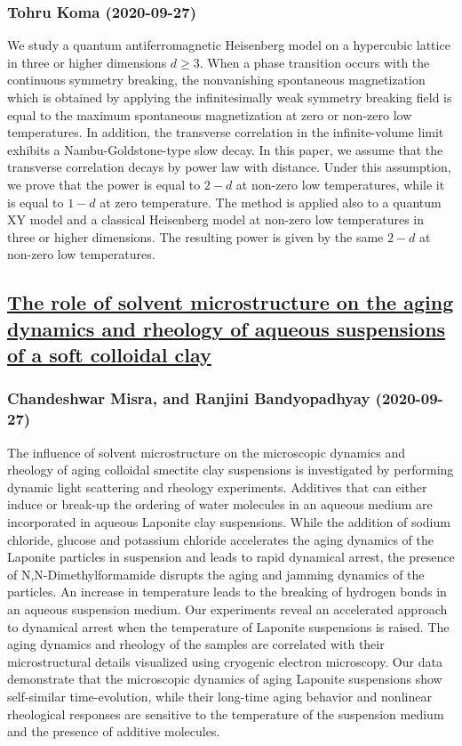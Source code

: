 \subsubsection*{Tohru Koma (2020-09-27)}
We study a quantum antiferromagnetic Heisenberg model on a hypercubic lattice
in three or higher dimensions $d\ge 3$. When a phase transition occurs with the
continuous symmetry breaking, the nonvanishing spontaneous magnetization which
is obtained by applying the infinitesimally weak symmetry breaking field is
equal to the maximum spontaneous magnetization at zero or non-zero low
temperatures. In addition, the transverse correlation in the infinite-volume
limit exhibits a Nambu-Goldstone-type slow decay. In this paper, we assume that
the transverse correlation decays by power law with distance. Under this
assumption, we prove that the power is equal to $2-d$ at non-zero low
temperatures, while it is equal to $1-d$ at zero temperature. The method is
applied also to a quantum XY model and a classical Heisenberg model at non-zero
low temperatures in three or higher dimensions. The resulting power is given by
the same $2-d$ at non-zero low temperatures.

\subsection*{\href{http://arxiv.org/abs/2009.12741v1}{The role of solvent microstructure on the aging dynamics and rheology of  aqueous suspensions of a soft colloidal clay}}
\subsubsection*{Chandeshwar Misra, and Ranjini Bandyopadhyay (2020-09-27)}
The influence of solvent microstructure on the microscopic dynamics and
rheology of aging colloidal smectite clay suspensions is investigated by
performing dynamic light scattering and rheology experiments. Additives that
can either induce or break-up the ordering of water molecules in an aqueous
medium are incorporated in aqueous Laponite clay suspensions. While the
addition of sodium chloride, glucose and potassium chloride accelerates the
aging dynamics of the Laponite particles in suspension and leads to rapid
dynamical arrest, the presence of N,N-Dimethylformamide disrupts the aging and
jamming dynamics of the particles. An increase in temperature leads to the
breaking of hydrogen bonds in an aqueous suspension medium. Our experiments
reveal an accelerated approach to dynamical arrest when the temperature of
Laponite suspensions is raised. The aging dynamics and rheology of the samples
are correlated with their microstructural details visualized using cryogenic
electron microscopy. Our data demonstrate that the microscopic dynamics of
aging Laponite suspensions show self-similar time-evolution, while their
long-time aging behavior and nonlinear rheological responses are sensitive to
the temperature of the suspension medium and the presence of additive
molecules.

